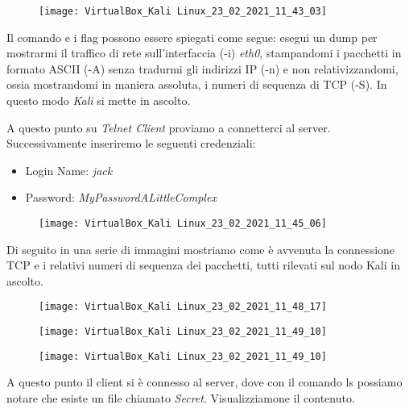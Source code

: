 \documentclass[14pt]{extreport}
\begin{document}
\vspace{5pt}

\begin{figure}[H]
\centering
\texttt{[image: VirtualBox\_Kali Linux\_23\_02\_2021\_11\_43\_03]}
\end{figure}

Il comando e i flag possono essere spiegati come segue: esegui un dump per mostrarmi il traffico di rete sull'interfaccia (-i) \textit{eth0}, stampandomi i pacchetti in formato ASCII (-A) senza tradurmi gli indirizzi IP (-n) e non relativizzandomi, ossia mostrandomi in maniera assoluta, i numeri di sequenza di TCP (-S). In questo modo \textit{Kali} si mette in ascolto.

A questo punto su \textit{Telnet Client} proviamo a connetterci al server. Successivamente inseriremo le seguenti credenziali:

\begin{itemize}
    \item Login Name: \textit{jack}
    \item Password: \textit{MyPasswordALittleComplex}
\end{itemize}

\begin{figure}[H]
\centering
\texttt{[image: VirtualBox\_Kali Linux\_23\_02\_2021\_11\_45\_06]}
\end{figure}

Di seguito in una serie di immagini mostriamo come è avvenuta la connessione TCP e i relativi numeri di sequenza dei pacchetti, tutti rilevati sul nodo Kali in ascolto.


\begin{figure}[H]
\centering
\texttt{[image: VirtualBox\_Kali Linux\_23\_02\_2021\_11\_48\_17]}
\end{figure}

\begin{figure}[H]
\centering
\texttt{[image: VirtualBox\_Kali Linux\_23\_02\_2021\_11\_49\_10]}
\end{figure}


\begin{figure}[H]
\centering
\texttt{[image: VirtualBox\_Kali Linux\_23\_02\_2021\_11\_49\_10]}
\end{figure}







A questo punto il client si è connesso al server, dove con il comando ls possiamo notare che esiste un file chiamato \textit{Secret}. Visualizziamone il contenuto.
\end{document}
